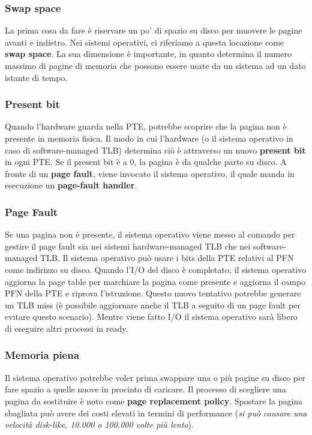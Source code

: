 \documentclass[12pt, twoside, letterpaper]{article}
\begin{document}
			\subsubsection{Swap space}
				La prima cosa da fare è riservare un po' di spazio su disco per muovere le pagine avanti e indietro. Nei sistemi operativi, ci riferiamo a questa locazione come \textbf{swap space}. La sua dimensione è importante, in quanto determina il numero massimo di pagine di memoria che possono essere usate da un sistema ad un dato istante di tempo.
				
			\subsubsection{Present bit}
				Quando l'hardware guarda nella PTE, potrebbe scoprire che la pagina non è presente in memoria fisica. Il modo in cui l'hardware  (o il sistema operativo in caso di software-managed TLB) determina ciò è attraverso un nuovo \textbf{present bit} in ogni PTE. Se il present bit è a 0, la pagina è da qualche parte su disco. A fronte di un \textbf{page fault}, viene invocato il sistema operativo, il quale manda in esecuzione un \textbf{page-fault handler}.
				
			\subsubsection{Page Fault}
				Se una pagina non è presente, il sistema operativo viene messo al comando per gestire il page fault sia nei sistemi hardware-managed TLB che nei software-managed TLB. Il sistema operativo può usare i bits della PTE relativi al PFN come indirizzo su disco. Quando l'I/O del disco è completato, il sistema operativo aggiorna la page table per marchiare la pagina come presente e aggiorna il campo PFN della PTE e riprova l'istruzione. Questo nuovo tentativo potrebbe generare un TLB miss (è possibile aggiornare anche il TLB a seguito di un page fault per evitare questo scenario). Mentre viene fatto I/O il sistema operativo sarà libero di eseguire altri processi in ready. 
				
			\subsubsection{Memoria piena}
				Il sistema operativo potrebbe voler prima swappare una o più pagine su disco per fare spazio a quelle nuove in procinto di caricare. Il processo di scegliere una pagina da sostituire è noto come \textbf{page replacement policy}. Spostare la pagina sbagliata può avere dei costi elevati in termini di performance (\textit{si può causare una velocità disk-like, 10.000 o 100.000 volte più lento}).\\
				
\end{document}
